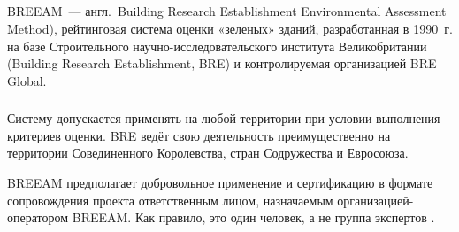 \subsection{}
BREEAM~--- \mbox{англ.}~Building  Research Establishment Environmental Assessment Method), рейтинговая  система  оценки «зеленых» зданий, разработанная в 1990~г.
на базе Строительного научно-исследовательского института Великобритании (Building Research Establishment, BRE) и контролируемая организацией BRE Global.


\subsubsection*{\scAssesmentScope}
Систему допускается применять на любой территории при условии выполнения критериев оценки.
BRE ведёт свою деятельность преимущественно на территории Совединенного Королевства, стран Содружества и Евросоюза.

BREEAM предполагает добровольное применение и сертификацию в формате сопровождения проекта ответственным лицом, назначаемым организацией-оператором BREEAM.
Как правило, это один человек, а не группа экспертов \cite{method_GB_BREEAM}.

